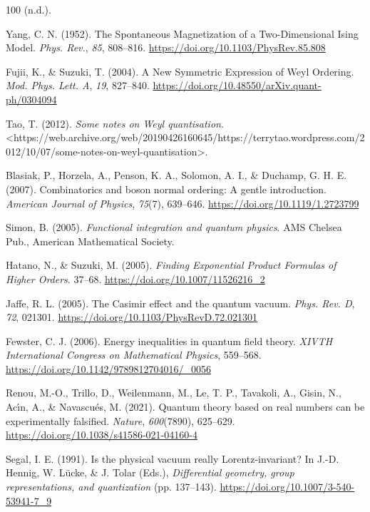 \documentclass[11pt]{book}
\begin{document}
\begin{thebibliography}{100}
 (n.d.).

 Yang, C. N. (1952). The Spontaneous Magnetization of a Two-Dimensional
Ising Model. \emph{Phys. Rev.}, \emph{85}, 808--816.
\url{https://doi.org/10.1103/PhysRev.85.808}

 Fujii, K., \& Suzuki, T. (2004). A New Symmetric Expression of Weyl
Ordering. \emph{Mod. Phys. Lett. A}, \emph{19}, 827--840.
\url{https://doi.org/10.48550/arXiv.quant-ph/0304094}

 Tao, T. (2012). \emph{Some notes on Weyl quantisation}.
\textless https://web.archive.org/web/20190426160645/https://terrytao.wordpress.com/2012/10/07/some-notes-on-weyl-quantisation\textgreater.

 Blasiak, P., Horzela, A., Penson, K. A., Solomon, A. I., \& Duchamp, G.
H. E. (2007). Combinatorics and boson normal ordering: A gentle
introduction. \emph{American Journal of Physics}, \emph{75}(7),
639--646. \url{https://doi.org/10.1119/1.2723799}

 Simon, B. (2005). \emph{Functional integration and quantum physics}. AMS
Chelsea Pub., American Mathematical Society.

 Hatano, N., \& Suzuki, M. (2005). \emph{Finding Exponential Product
Formulas of Higher Orders}. 37--68.
\url{https://doi.org/10.1007/11526216_2}

 Jaffe, R. L. (2005). The Casimir effect and the quantum vacuum.
\emph{Phys. Rev. D}, \emph{72}, 021301.
\url{https://doi.org/10.1103/PhysRevD.72.021301}

 Fewster, C. J. (2006). Energy inequalities in quantum field theory.
\emph{XIVTH International Congress on Mathematical Physics}, 559--568.
\url{https://doi.org/10.1142/9789812704016/_0056}

 Renou, M.-O., Trillo, D., Weilenmann, M., Le, T. P., Tavakoli, A.,
Gisin, N., Acı́n, A., \& Navascués, M. (2021). Quantum theory based on
real numbers can be experimentally falsified. \emph{Nature},
\emph{600}(7890), 625--629.
\url{https://doi.org/10.1038/s41586-021-04160-4}

 Segal, I. E. (1991). Is the physical vacuum really Lorentz-invariant? In
J.-D. Hennig, W. Lücke, \& J. Tolar (Eds.), \emph{Differential geometry,
group representations, and quantization} (pp. 137--143).
\url{https://doi.org/10.1007/3-540-53941-7_9}


\end{thebibliography}
\end{document}
